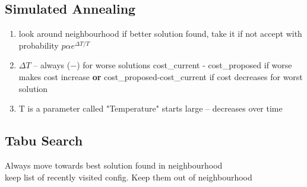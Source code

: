 \documentclass{article}
\begin{document}
\subsection{Simulated Annealing}
\begin{enumerate}
	\item look around neighbourhood
		\subitem if better solution found, take it
		\subitem if not accept with probability
		\subitem $p \alpha e^{\Delta T/T}$
	\item $\Delta T$ -- always ($-$) for worse solutions
		\subitem cost\_current - cost\_proposed
		\subitem if worse makes cost increase
		\subitem \textbf{or} cost\_proposed-cost\_current
		\subitem if cost decreases for worst solution
	\item T is a parameter called "Temperature"
		\subitem starts large -- decreases over time
\end{enumerate}	
\subsection{Tabu Search}
Always move towards best solution found in neighbourhood\\
keep list of recently visited config. Keep them out of neighbourhood
\end{document}
